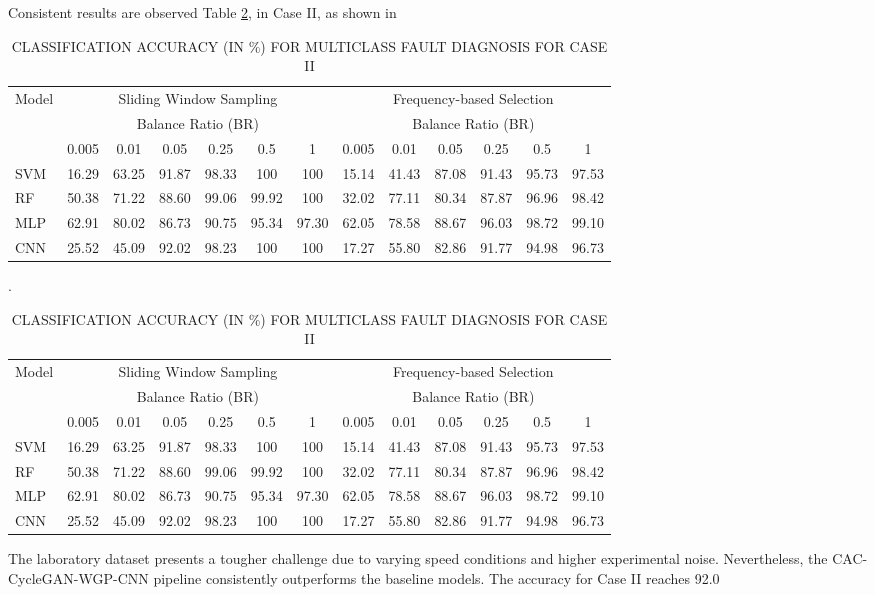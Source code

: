 \documentclass[twocolumn]{IEEEtran}
\begin{document}
Consistent results are observed Table \ref{tab:accuracy_caseII}, in Case II, as shown in \begin{table}[htbp]
\centering
\caption{CLASSIFICATION ACCURACY (IN \%) FOR MULTICLASS FAULT DIAGNOSIS FOR CASE II}
\label{tab:accuracy_caseII}
\begin{tabular}{lcccccccccccc}
\hline
\multirow{2}{*}{Model} & \multicolumn{6}{c}{Sliding Window Sampling} & \multicolumn{6}{c}{Frequency-based Selection} \\
 & \multicolumn{6}{c}{Balance Ratio (BR)} & \multicolumn{6}{c}{Balance Ratio (BR)} \\
 & 0.005 & 0.01 & 0.05 & 0.25 & 0.5 & 1 & 0.005 & 0.01 & 0.05 & 0.25 & 0.5 & 1 \\
\hline
SVM & 16.29 & 63.25 & 91.87 & 98.33 & 100 & 100 & 15.14 & 41.43 & 87.08 & 91.43 & 95.73 & 97.53 \\
RF & 50.38 & 71.22 & 88.60 & 99.06 & 99.92 & 100 & 32.02 & 77.11 & 80.34 & 87.87 & 96.96 & 98.42 \\
MLP & 62.91 & 80.02 & 86.73 & 90.75 & 95.34 & 97.30 & 62.05 & 78.58 & 88.67 & 96.03 & 98.72 & 99.10 \\
CNN & 25.52 & 45.09 & 92.02 & 98.23 & 100 & 100 & 17.27 & 55.80 & 82.86 & 91.77 & 94.98 & 96.73 \\
\hline
\end{tabular}
\end{table}. 

\begin{table}[htbp]
\centering
\caption{CLASSIFICATION ACCURACY (IN \%) FOR MULTICLASS FAULT DIAGNOSIS FOR CASE II}
\label{tab:accuracy_caseII}
\begin{tabular}{lcccccccccccc}
\hline
\multirow{2}{*}{Model} & \multicolumn{6}{c}{Sliding Window Sampling} & \multicolumn{6}{c}{Frequency-based Selection} \\
 & \multicolumn{6}{c}{Balance Ratio (BR)} & \multicolumn{6}{c}{Balance Ratio (BR)} \\
 & 0.005 & 0.01 & 0.05 & 0.25 & 0.5 & 1 & 0.005 & 0.01 & 0.05 & 0.25 & 0.5 & 1 \\
\hline
SVM & 16.29 & 63.25 & 91.87 & 98.33 & 100 & 100 & 15.14 & 41.43 & 87.08 & 91.43 & 95.73 & 97.53 \\
RF & 50.38 & 71.22 & 88.60 & 99.06 & 99.92 & 100 & 32.02 & 77.11 & 80.34 & 87.87 & 96.96 & 98.42 \\
MLP & 62.91 & 80.02 & 86.73 & 90.75 & 95.34 & 97.30 & 62.05 & 78.58 & 88.67 & 96.03 & 98.72 & 99.10 \\
CNN & 25.52 & 45.09 & 92.02 & 98.23 & 100 & 100 & 17.27 & 55.80 & 82.86 & 91.77 & 94.98 & 96.73 \\
\hline
\end{tabular}
\end{table}
The laboratory dataset presents a tougher challenge due to varying speed conditions and higher experimental noise. Nevertheless, the CAC-CycleGAN-WGP-CNN pipeline consistently outperforms the baseline models. The accuracy for Case II reaches 92.0%
\end{document}
